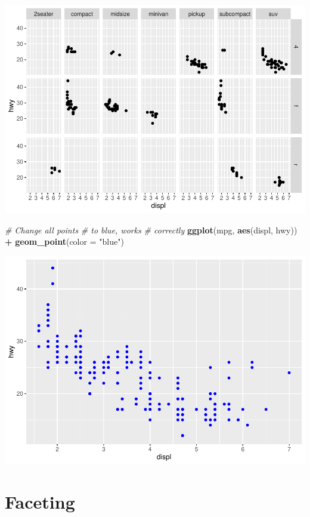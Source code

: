 \documentclass[
]{book}
\newenvironment{Shaded}{\begin{snugshade}}{\end{snugshade}}
\newcommand{\CommentTok}[1]{\textcolor[rgb]{0.56,0.35,0.01}{\textit{#1}}}
\newcommand{\DataTypeTok}[1]{\textcolor[rgb]{0.13,0.29,0.53}{#1}}
\newcommand{\KeywordTok}[1]{\textcolor[rgb]{0.13,0.29,0.53}{\textbf{#1}}}
\newcommand{\NormalTok}[1]{#1}
\newcommand{\OperatorTok}[1]{\textcolor[rgb]{0.81,0.36,0.00}{\textbf{#1}}}
\newcommand{\StringTok}[1]{\textcolor[rgb]{0.31,0.60,0.02}{#1}}
\begin{document}
\includegraphics{_main_files/figure-latex/unnamed-chunk-254-2.pdf}

\begin{Shaded}
\begin{Highlighting}[]
\CommentTok{# Change all points}
\CommentTok{# to blue, works}
\CommentTok{# correctly}
\KeywordTok{ggplot}\NormalTok{(mpg, }\KeywordTok{aes}\NormalTok{(displ,}
\NormalTok{    hwy)) }\OperatorTok{+}\StringTok{ }\KeywordTok{geom_point}\NormalTok{(}\DataTypeTok{color =} \StringTok{"blue"}\NormalTok{)}
\end{Highlighting}
\end{Shaded}

\includegraphics{_main_files/figure-latex/unnamed-chunk-254-3.pdf}

\hypertarget{faceting}{%
\section{Faceting}\label{faceting}}
\end{document}
